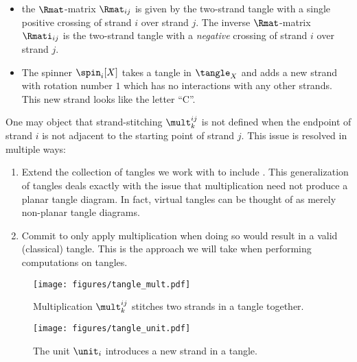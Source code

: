 \begin{theorem}
\begin{itemize}
                \item the $\Rmat$-matrix $\Rmat_{ij}$ is given by the two-strand
                        tangle with a single positive crossing of strand $i$
                        over strand $j$. The inverse $\Rmat$-matrix
                        $\Rmati_{ij}$ is the two-strand tangle with a
                        \emph{negative} crossing of strand $i$ over strand $j$.
                \item The spinner $\spin_i[X]$ takes a tangle in $\tangle_X$ and
                        adds a new strand with rotation number $1$ which has no
                        interactions with any other strands. This new strand
                        looks like the letter \enquote{C}.
        \end{itemize}
\end{theorem}
\begin{remark}
        One may object that strand-stitching $\mult^{ij}_k$ is not defined when
        the endpoint of strand $i$ is not adjacent to the starting point of
        strand $j$. This issue is resolved in multiple ways:
        \begin{enumerate}
                \item Extend the collection of tangles we work with to include
                        . This generalization of tangles
                        deals exactly with the issue that multiplication need
                        not produce a planar tangle diagram. In fact, virtual
                        tangles can be thought of as merely non-planar tangle
                        diagrams.
                \item Commit to only apply multiplication when doing so would
                        result in a valid (classical) tangle. This is the
                        approach we will take when performing computations on
                        tangles.
        \end{enumerate}
\end{remark}
\begin{figure}[h]
        \centering
        \texttt{[image: figures/tangle\_mult.pdf]}
        \caption{
                Multiplication $\mult^{ij}_{k}$ stitches two strands in a tangle
                together.
        }
        \label{fig:tangle_mult}
\end{figure}
\begin{figure}[h]
        \centering
        \texttt{[image: figures/tangle\_unit.pdf]}
        \caption{The unit $\unit_i$ introduces a new strand in a tangle.}
        \label{fig:tangle_unit}
\end{figure}

